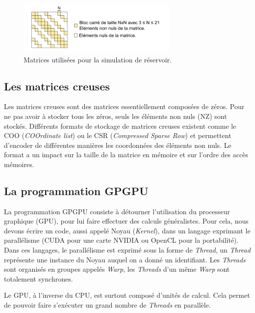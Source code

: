 \documentclass[renpar]{compas2013}
\begin{document}
  \begin{figure}\begin{center}
      \includegraphics[width=0.7\textwidth]{images/matrices_reservoir.pdf}
      \caption{Matrices utilisées pour la simulation de réservoir.}
      \label{matrice_reservoir}
  \end{center}\end{figure}

 \subsection{Les matrices creuses}
  Les matrices creuses sont des matrices essentiellement composées de zéros.  
  Pour ne pas avoir à stocker tous les zéros, seuls les éléments non
  nuls (NZ) sont stockés. Différents formats de stockage de matrices
  creuses existent comme le COO (\textit{COOrdinate list}) ou le CSR
  (\textit{Compressed Sparse Row}) et permettent d'encoder de
  différentes manières les coordonnées des éléments non nuls.
  Le format a un impact sur la taille de la matrice en mémoire et sur
  l'ordre des accès mémoires.

 \subsection{La programmation GPGPU}
  La programmation GPGPU consiste à détourner l'utilisation du
  processeur graphique (GPU), pour lui faire effectuer des calculs
  généralistes. Pour cela, nous devons écrire 
  un code, aussi appelé Noyau (\textit{Kernel}), dans un langage exprimant le
  parallélisme (CUDA pour une carte NVIDIA ou OpenCL
  pour la portabilité). Dans ces langages, le
  parallélisme est exprimé sous la forme de \textit{Thread}, un \textit{Thread}
  représente une instance du Noyau auquel on a donné un identifiant.
  Les \textit{Threads} sont organisés en groupes appelés \textit{Warp}, les \textit{Threads}
  d'un même \textit{Warp} sont totalement synchrones.

  Le GPU, à l'inverse du CPU, est surtout composé d'unités de calcul.
  Cela permet de pouvoir faire s'exécuter un grand nombre de \textit{Threads} en
  parallèle.
  
\end{document}
